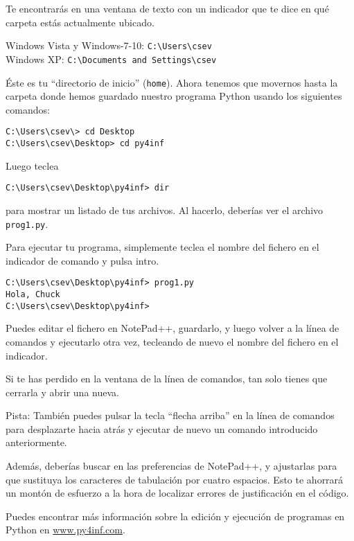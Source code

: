 Te encontrarás en una ventana de texto con un indicador que
te dice en qué carpeta estás actualmente ubicado.

Windows Vista y Windows-7-10: {\tt C:{\textbackslash}Users{\textbackslash}csev}\\
Windows XP: {\tt C:{\textbackslash}Documents and Settings{\textbackslash}csev}

Éste es tu ``directorio de inicio'' ({\tt home}). Ahora tenemos que movernos hasta
la carpeta donde hemos guardado nuestro programa Python usando
los siguientes comandos:

\beforeverb
\begin{verbatim}
C:\Users\csev\> cd Desktop
C:\Users\csev\Desktop> cd py4inf
\end{verbatim}
\afterverb
%
Luego teclea

\beforeverb
\begin{verbatim}
C:\Users\csev\Desktop\py4inf> dir 
\end{verbatim}
\afterverb
%
para mostrar un listado de tus archivos. Al hacerlo, 
deberías ver el archivo {\tt prog1.py}.

Para ejecutar tu programa, simplemente teclea el nombre del fichero en
el indicador de comando y pulsa intro.

\beforeverb
\begin{verbatim}
C:\Users\csev\Desktop\py4inf> prog1.py
Hola, Chuck
C:\Users\csev\Desktop\py4inf> 
\end{verbatim}
\afterverb
%
Puedes editar el fichero en NotePad++, guardarlo, y luego volver
a la línea de comandos y ejecutarlo otra vez, tecleando de nuevo
el nombre del fichero en el indicador.

Si te has perdido en la ventana de la línea de comandos, tan solo tienes
que cerrarla y abrir una nueva.

Pista: También puedes pulsar la tecla ``flecha arriba'' en la línea de comandos para
desplazarte hacia atrás y ejecutar de nuevo un comando introducido anteriormente.

Además, deberías buscar en las preferencias de NotePad++, y ajustarlas para
que sustituya los caracteres de tabulación por cuatro espacios. Esto te ahorrará
un montón de esfuerzo a la hora de localizar errores de justificación en el código.

Puedes encontrar más información sobre la edición y ejecución de
programas en Python en \url{www.py4inf.com}.

